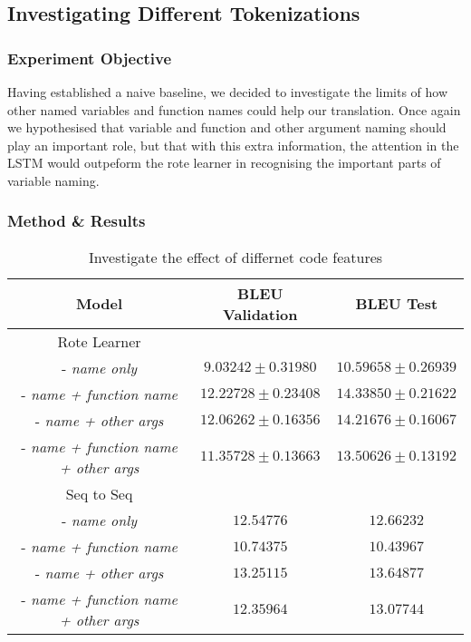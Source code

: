 \subsection{Investigating Different Tokenizations} %
\label{sub:investigating_different_tokenizations}

\subsubsection{Experiment Objective} %

Having established a naive baseline, we decided to investigate the limits of how other named variables and function names could help our translation.
Once again we hypothesised that variable and function and other argument naming should play an important role, but that with this extra information, the attention in the LSTM would outpeform the rote learner in recognising the important parts of variable naming.

\subsubsection{Method \& Results} %




\begin{table}[h!]
\begin{center}
\begin{tabular}{ c | c | c }
    Model                               & BLEU Validation            & BLEU Test  \\
    \hline
    \hline
    Rote Learner                        &                  & \\    
    - \textit{name only}                & $ 9.03242  \pm  0.31980 $ & $ 10.59658 \pm 0.26939 $  \\
    - \textit{name + function name}     & $ 12.22728 \pm  0.23408 $ & $ 14.33850 \pm 0.21622 $  \\
    - \textit{name + other args}        & $ 12.06262 \pm  0.16356 $ & $ 14.21676 \pm 0.16067 $  \\
    - \textit{name + function name + other args}  & $ 11.35728 \pm  0.13663 $ & $ 13.50626 \pm 0.13192 $ \\
    \hline
    \hline
    Seq to Seq                          &                  & \\
    - \textit{name only}                & $ 12.54776 $ & $ 12.66232 $  \\
    - \textit{name + function name}     & $ 10.74375 $ & $ 10.43967 $  \\
    - \textit{name + other args}        & $ 13.25115 $ & $ 13.64877 $  \\
    - \textit{name + function name + other args}    & $ 12.35964 $ & $ 13.07744 $  \\
    \hline
\end{tabular}
\caption {Investigate the effect of differnet code features}
\label{table:tokenization}
\end{center}
\end{table}





